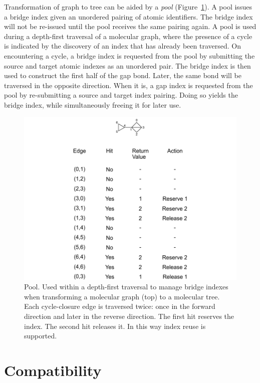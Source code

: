 \documentclass{article}
\begin{document}
Transformation of graph to tree can be aided by a \textit{pool} (Figure~\ref{fig:pool}). A pool issues a bridge index given an unordered pairing of atomic identifiers. The bridge index will not be re-issued until the pool receives the same pairing again. A pool is used during a depth-first traversal of a molecular graph, where the presence of a cycle is indicated by the discovery of an index that has already been traversed. On encountering a cycle, a bridge index is requested from the pool by submitting the source and target atomic indexes as an unordered pair. The bridge index is then used to construct the first half of the gap bond. Later, the same bond will be traversed in the opposite direction. When it is, a gap index is requested from the pool by re-submitting a source and target index pairing. Doing so yields the bridge index, while simultaneously freeing it for later use.

\begin{figure}
    \centering
    \includegraphics[width=\columnwidth]{deck.pdf}
    \caption{Pool. Used within a depth-first traversal to manage bridge indexes when transforming a molecular graph (top) to a molecular tree. Each cycle-closure edge is traversed twice: once in the forward direction and later in the reverse direction. The first hit reserves the index. The second hit releases it. In this way index reuse is supported.}
    \label{fig:pool}
\end{figure}

\section*{Compatibility}
\end{document}
